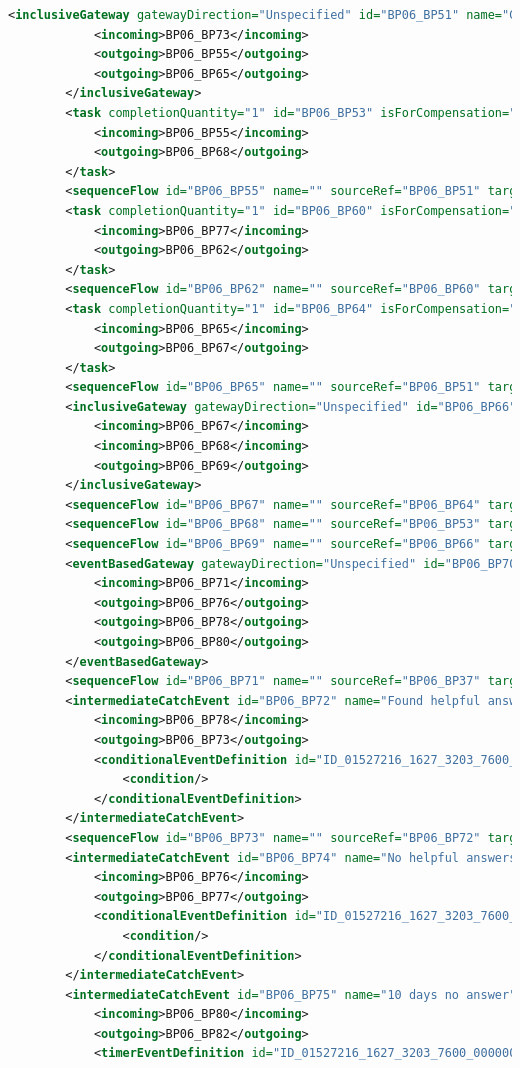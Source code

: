 \documentclass[runningheads]{llncs}
\begin{document}
\begin{lstlisting}[language={XML}]
		<inclusiveGateway gatewayDirection="Unspecified" id="BP06_BP51" name="Gateway">
			<incoming>BP06_BP73</incoming>
			<outgoing>BP06_BP55</outgoing>
			<outgoing>BP06_BP65</outgoing>
		</inclusiveGateway>
		<task completionQuantity="1" id="BP06_BP53" isForCompensation="false" name="Comment answer">
			<incoming>BP06_BP55</incoming>
			<outgoing>BP06_BP68</outgoing>
		</task>
		<sequenceFlow id="BP06_BP55" name="" sourceRef="BP06_BP51" targetRef="BP06_BP53"/>
		<task completionQuantity="1" id="BP06_BP60" isForCompensation="false" name="Invite user to answer">
			<incoming>BP06_BP77</incoming>
			<outgoing>BP06_BP62</outgoing>
		</task>
		<sequenceFlow id="BP06_BP62" name="" sourceRef="BP06_BP60" targetRef="BP06_BP41"/>
		<task completionQuantity="1" id="BP06_BP64" isForCompensation="false" name="Vote answer">
			<incoming>BP06_BP65</incoming>
			<outgoing>BP06_BP67</outgoing>
		</task>
		<sequenceFlow id="BP06_BP65" name="" sourceRef="BP06_BP51" targetRef="BP06_BP64"/>
		<inclusiveGateway gatewayDirection="Unspecified" id="BP06_BP66" name="Gateway2">
			<incoming>BP06_BP67</incoming>
			<incoming>BP06_BP68</incoming>
			<outgoing>BP06_BP69</outgoing>
		</inclusiveGateway>
		<sequenceFlow id="BP06_BP67" name="" sourceRef="BP06_BP64" targetRef="BP06_BP66"/>
		<sequenceFlow id="BP06_BP68" name="" sourceRef="BP06_BP53" targetRef="BP06_BP66"/>
		<sequenceFlow id="BP06_BP69" name="" sourceRef="BP06_BP66" targetRef="BP06_BP45"/>
		<eventBasedGateway gatewayDirection="Unspecified" id="BP06_BP70" instantiate="false" name="">
			<incoming>BP06_BP71</incoming>
			<outgoing>BP06_BP76</outgoing>
			<outgoing>BP06_BP78</outgoing>
			<outgoing>BP06_BP80</outgoing>
		</eventBasedGateway>
		<sequenceFlow id="BP06_BP71" name="" sourceRef="BP06_BP37" targetRef="BP06_BP70"/>
		<intermediateCatchEvent id="BP06_BP72" name="Found helpful answer">
			<incoming>BP06_BP78</incoming>
			<outgoing>BP06_BP73</outgoing>
			<conditionalEventDefinition id="ID_01527216_1627_3203_7600_000000200061">
				<condition/>
			</conditionalEventDefinition>
		</intermediateCatchEvent>
		<sequenceFlow id="BP06_BP73" name="" sourceRef="BP06_BP72" targetRef="BP06_BP51"/>
		<intermediateCatchEvent id="BP06_BP74" name="No helpful answers">
			<incoming>BP06_BP76</incoming>
			<outgoing>BP06_BP77</outgoing>
			<conditionalEventDefinition id="ID_01527216_1627_3203_7600_000000200062">
				<condition/>
			</conditionalEventDefinition>
		</intermediateCatchEvent>
		<intermediateCatchEvent id="BP06_BP75" name="10 days no answer">
			<incoming>BP06_BP80</incoming>
			<outgoing>BP06_BP82</outgoing>
			<timerEventDefinition id="ID_01527216_1627_3203_7600_000000200063"/>

\end{lstlisting}
\end{document}
